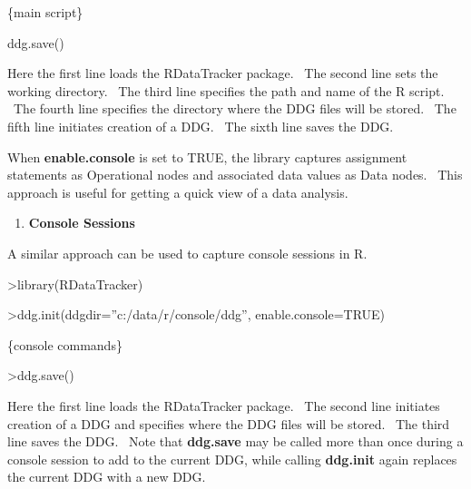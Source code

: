 \documentclass[letterpaper]{article}
\newcounter{saveenum}
\newcommand\liststyleWWNumxv{%
\renewcommand\theenumi{\arabic{enumi}}
\renewcommand\theenumii{\alph{enumii}}
\renewcommand\theenumiii{\alph{enumii}.\roman{enumiii}}
\renewcommand\theenumiv{\alph{enumii}.\roman{enumiii}.\arabic{enumiv}}
\renewcommand\labelenumi{\theenumi.}
\renewcommand\labelenumii{\theenumii.}
\renewcommand\labelenumiii{\theenumiii.}
\renewcommand\labelenumiv{\theenumiv.}
}
\begin{document}
\bigskip

\textcolor[rgb]{0.21176471,0.37254903,0.5686275}{\{main script\}}


\bigskip

\textcolor[rgb]{0.21176471,0.37254903,0.5686275}{ddg.save()}


\bigskip

Here the first line loads the RDataTracker package. \ The second line sets the working directory. \ The third line specifies the path and name of the R script. \ The fourth line specifies the directory where the DDG files will be stored. \ The fifth line initiates creation of a DDG. \ The sixth line saves the DDG.


\bigskip

When \textbf{enable.console} is set to TRUE, the library captures assignment statements as Operational nodes and associated data values as Data nodes. \ This approach is useful for getting a quick view of a data analysis.


\bigskip

\liststyleWWNumxv
\setcounter{saveenum}{\value{enumi}}
\begin{enumerate}
\setcounter{enumi}{\value{saveenum}}
\item \textbf{Console Sessions}
\end{enumerate}

\bigskip

A similar approach can be used to capture console sessions in R.


\bigskip

\textcolor[rgb]{0.21176471,0.37254903,0.5686275}{{\textgreater}library(RDataTracker)}

\textcolor[rgb]{0.21176471,0.37254903,0.5686275}{{\textgreater}ddg.init(ddgdir=''c:/data/r/console/ddg'', enable.console=TRUE)}


\bigskip

\textcolor[rgb]{0.21176471,0.37254903,0.5686275}{\{console commands\}}


\bigskip

\textcolor[rgb]{0.21176471,0.37254903,0.5686275}{{\textgreater}ddg.save()}


\bigskip

Here the first line loads the RDataTracker package. \ The second line initiates creation of a DDG and specifies where the DDG files will be stored. \ The third line saves the DDG. \ Note that \textbf{ddg.save} may be called more than once during a console session to add to the current DDG, while calling \textbf{ddg.init} again replaces the current DDG with a new DDG.
\end{document}
